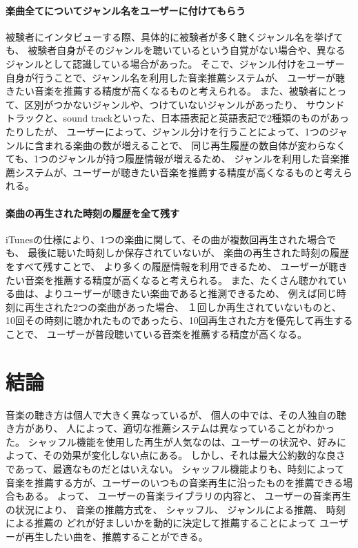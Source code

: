 \documentclass[11pt, onecolumn]{jsarticle}
\begin{document}
\paragraph{楽曲全てについてジャンル名をユーザーに付けてもらう}
被験者にインタビューする際、具体的に被験者が多く聴くジャンル名を挙げても、
被験者自身がそのジャンルを聴いているという自覚がない場合や、異なるジャンルとして認識している場合があった。
そこで、ジャンル付けをユーザー自身が行うことで、ジャンル名を利用した音楽推薦システムが、
ユーザーが聴きたい音楽を推薦する精度が高くなるものと考えられる。
また、被験者にとって、区別がつかないジャンルや、つけていないジャンルがあったり、
サウンドトラックと、sound trackといった、日本語表記と英語表記で2種類のものがあったりしたが、
ユーザーによって、ジャンル分けを行うことによって、1つのジャンルに含まれる楽曲の数が増えることで、
同じ再生履歴の数自体が変わらなくても、1つのジャンルが持つ履歴情報が増えるため、
ジャンルを利用した音楽推薦システムが、ユーザーが聴きたい音楽を推薦する精度が高くなるものと考えられる。
\paragraph{楽曲の再生された時刻の履歴を全て残す}
iTunesの仕様により、1つの楽曲に関して、その曲が複数回再生された場合でも、
最後に聴いた時刻しか保存されていないが、
楽曲の再生された時刻の履歴をすべて残すことで、
より多くの履歴情報を利用できるため、
ユーザーが聴きたい音楽を推薦する精度が高くなると考えられる。
また、たくさん聴かれている曲は、よりユーザーが聴きたい楽曲であると推測できるため、
例えば同じ時刻に再生された2つの楽曲があった場合、
１回しか再生されていないものと、
10回その時刻に聴かれたものであったら、10回再生された方を優先して再生することで、
ユーザーが普段聴いている音楽を推薦する精度が高くなる。



\section{結論}
音楽の聴き方は個人で大きく異なっているが、
個人の中では、その人独自の聴き方があり、
人によって、適切な推薦システムは異なっていることがわかった。
シャッフル機能を使用した再生が人気なのは、ユーザーの状況や、好みによって、その効果が変化しない点にある。
しかし、それは最大公約数的な良さであって、最適なものだとはいえない。
シャッフル機能よりも、時刻によって音楽を推薦する方が、ユーザーのいつもの音楽再生に沿ったものを推薦できる場合もある。
よって、
ユーザーの音楽ライブラリの内容と、
ユーザーの音楽再生の状況により、
音楽の推薦方式を、
シャッフル、
ジャンルによる推薦、
時刻による推薦の
どれが好ましいかを動的に決定して推薦することによって
ユーザーが再生したい曲を、推薦することができる。
\end{document}

